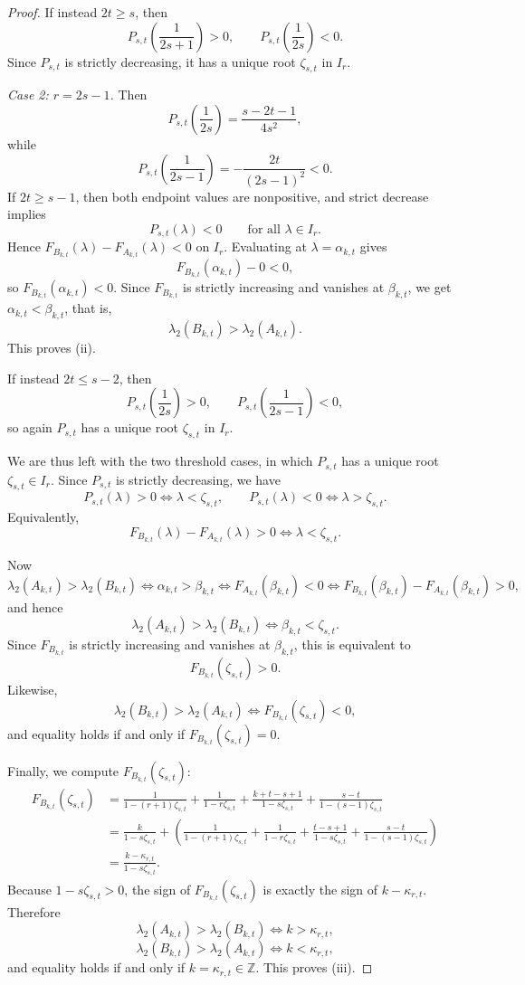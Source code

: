 \documentclass[11pt]{article}
\theoremstyle{remark}
\begin{document}
\begin{proof}
If instead $2t\ge s$, then
$$
P_{s,t}\!\left(\frac1{2s+1}\right)>0,
\qquad
P_{s,t}\!\left(\frac1{2s}\right)<0.
$$
Since $P_{s,t}$ is strictly decreasing, it has a unique root $\zeta_{s,t}$ in $I_r$.

\medskip
\noindent
{\it Case 2: $r=2s-1$.}
Then
$$
P_{s,t}\!\left(\frac1{2s}\right)=\frac{s-2t-1}{4s^2},
$$
while
$$
P_{s,t}\!\left(\frac1{2s-1}\right)= -\frac{2t}{(2s-1)^2}<0.
$$
If $2t\ge s-1$, then both endpoint values are nonpositive, and strict decrease implies
$$
P_{s,t}(\lambda)<0\qquad \text{for all }\lambda\in I_r.
$$
Hence $F_{B_{k,t}}(\lambda)-F_{A_{k,t}}(\lambda)<0$ on $I_r$.
Evaluating at $\lambda=\alpha_{k,t}$ gives
$$
F_{B_{k,t}}(\alpha_{k,t})-0<0,
$$
so $F_{B_{k,t}}(\alpha_{k,t})<0$.
Since $F_{B_{k,t}}$ is strictly increasing and vanishes at $\beta_{k,t}$, we get $\alpha_{k,t}<\beta_{k,t}$, that is,
$$
\lambda_2(B_{k,t})>\lambda_2(A_{k,t}).
$$
This proves \textnormal{(ii)}.

If instead $2t\le s-2$, then
$$
P_{s,t}\!\left(\frac1{2s}\right)>0,
\qquad
P_{s,t}\!\left(\frac1{2s-1}\right)<0,
$$
so again $P_{s,t}$ has a unique root $\zeta_{s,t}$ in $I_r$.

\medskip
We are thus left with the two threshold cases, in which $P_{s,t}$ has a unique root $\zeta_{s,t}\in I_r$.
Since $P_{s,t}$ is strictly decreasing, we have
$$
P_{s,t}(\lambda)>0\iff \lambda<\zeta_{s,t},
\qquad
P_{s,t}(\lambda)<0\iff \lambda>\zeta_{s,t}.
$$
Equivalently,
$$
F_{B_{k,t}}(\lambda)-F_{A_{k,t}}(\lambda)>0\iff \lambda<\zeta_{s,t}.
$$

Now
$$
\lambda_2(A_{k,t})>\lambda_2(B_{k,t})
\iff \alpha_{k,t}>\beta_{k,t}
\iff F_{A_{k,t}}(\beta_{k,t})<0
\iff F_{B_{k,t}}(\beta_{k,t})-F_{A_{k,t}}(\beta_{k,t})>0,
$$
and hence
$$
\lambda_2(A_{k,t})>\lambda_2(B_{k,t})\iff \beta_{k,t}<\zeta_{s,t}.
$$
Since $F_{B_{k,t}}$ is strictly increasing and vanishes at $\beta_{k,t}$, this is equivalent to
$$
F_{B_{k,t}}(\zeta_{s,t})>0.
$$
Likewise,
$$
\lambda_2(B_{k,t})>\lambda_2(A_{k,t})\iff F_{B_{k,t}}(\zeta_{s,t})<0,
$$
and equality holds if and only if $F_{B_{k,t}}(\zeta_{s,t})=0$.

Finally, we compute $F_{B_{k,t}}(\zeta_{s,t})$:
\begin{align*}
F_{B_{k,t}}(\zeta_{s,t})
&=
\frac{1}{1-(r+1)\zeta_{s,t}}
+\frac{1}{1-r\zeta_{s,t}}
+\frac{k+t-s+1}{1-s\zeta_{s,t}}
+\frac{s-t}{1-(s-1)\zeta_{s,t}}\\
&=
\frac{k}{1-s\zeta_{s,t}}
+\left(
\frac{1}{1-(r+1)\zeta_{s,t}}
+\frac{1}{1-r\zeta_{s,t}}
+\frac{t-s+1}{1-s\zeta_{s,t}}
+\frac{s-t}{1-(s-1)\zeta_{s,t}}
\right)\\
&=
\frac{k-\kappa_{r,t}}{1-s\zeta_{s,t}}.
\end{align*}
Because $1-s\zeta_{s,t}>0$, the sign of $F_{B_{k,t}}(\zeta_{s,t})$ is exactly the sign of $k-\kappa_{r,t}$.
Therefore
$$
\lambda_2(A_{k,t})>\lambda_2(B_{k,t})\iff k>\kappa_{r,t},
$$
$$
\lambda_2(B_{k,t})>\lambda_2(A_{k,t})\iff k<\kappa_{r,t},
$$
and equality holds if and only if $k=\kappa_{r,t}\in\mathbb Z$.
This proves \textnormal{(iii)}.
\end{proof}
\end{document}
